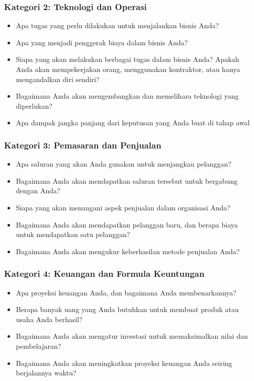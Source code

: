 \documentclass{article}
\begin{document}
\subsubsection{Kategori 2: Teknologi dan Operasi}
\begin{itemize}
    \item Apa tugas yang perlu dilakukan untuk menjalankan bisnis Anda?
    \item Apa yang menjadi penggerak biaya dalam bisnis Anda?
    \item Siapa yang akan melakukan berbagai tugas dalam bisnis Anda? Apakah Anda akan mempekerjakan orang, menggunakan kontraktor, atau hanya mengandalkan diri sendiri?
    \item Bagaimana Anda akan mengembangkan dan memelihara teknologi yang diperlukan?
    \item Apa dampak jangka panjang dari keputusan yang Anda buat di tahap awal
\end{itemize}

\subsubsection{Kategori 3: Pemasaran dan Penjualan}
\begin{itemize}
    \item Apa saluran yang akan Anda gunakan untuk menjangkau pelanggan?
    \item Bagaimana Anda akan mendapatkan saluran tersebut untuk bergabung dengan Anda?
    \item Siapa yang akan menangani aspek penjualan dalam organisasi Anda?
    \item Bagaimana Anda akan mendapatkan pelanggan baru, dan berapa biaya untuk mendapatkan satu pelanggan?
    \item Bagaimana Anda akan mengukur keberhasilan metode penjualan Anda?
\end{itemize}

\subsubsection{Kategori 4: Keuangan dan Formula Keuntungan}
\begin{itemize}
    \item Apa proyeksi keuangan Anda, dan bagaimana Anda membenarkannya?
    \item Berapa banyak uang yang Anda butuhkan untuk membuat produk atau usaha Anda berhasil?
    \item Bagaimana Anda akan mengatur investasi untuk memaksimalkan nilai dan pembelajaran?
    \item Bagaimana Anda akan meningkatkan proyeksi keuangan Anda seiring berjalannya waktu?
\end{itemize}
\end{document}
